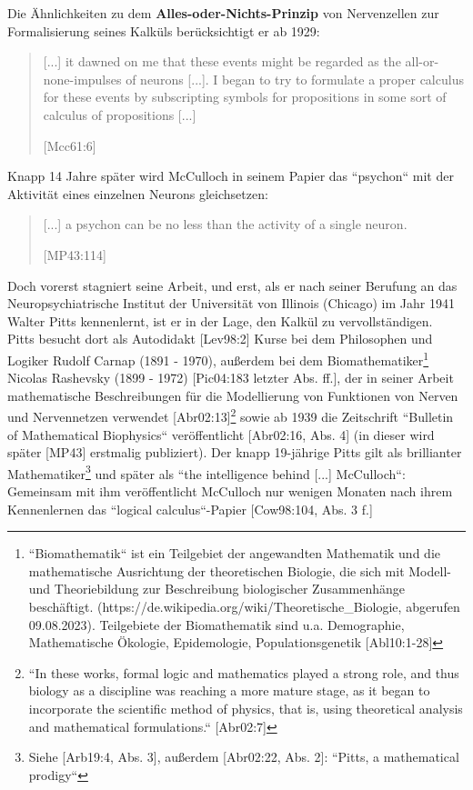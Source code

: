 Die Ähnlichkeiten zu dem \textbf{Alles-oder-Nichts-Prinzip} von Nervenzellen zur Formalisierung seines Kalküls berücksichtigt er ab 1929:

\blockquote[{[Mcc61:6]}]{
    [...] it dawned on me that these events might be regarded as the all-or-none-impulses of neurons [...]. I began to try to formulate a proper calculus for these events by subscripting symbols for propositions in some sort of calculus of propositions [...]
}

Knapp 14 Jahre später wird McCulloch in seinem Papier das ``psychon`` mit der Aktivität eines einzelnen Neurons gleichsetzen:

\blockquote[{[MP43:114]}]{
    [...] a psychon can be no less than the activity of a single neuron.
}

Doch vorerst stagniert seine Arbeit, und erst, als er nach seiner Berufung an das Neuropsychiatrische Institut der Universität von Illinois (Chicago) im Jahr 1941 Walter Pitts kennenlernt, ist er in der Lage, den Kalkül zu vervollständigen.\\

Pitts besucht dort als Autodidakt [Lev98:2] Kurse bei dem Philosophen und Logiker Rudolf Carnap (1891 - 1970), außerdem bei dem Biomathematiker\footnote{
    ``Biomathematik`` ist ein Teilgebiet der angewandten Mathematik und die mathematische Ausrichtung der theoretischen Biologie, die sich mit Modell- und Theoriebildung zur Beschreibung biologischer Zusammenhänge beschäftigt. ({https://de.wikipedia.org/wiki/Theoretische\_Biologie}, abgerufen 09.08.2023). Teilgebiete der Biomathematik sind u.a. Demographie, Mathematische Ökologie, Epidemologie, Populationsgenetik [Abl10:1-28]
} Nicolas Rashevsky (1899 - 1972) [Pic04:183 letzter Abs. ff.], der in seiner Arbeit mathematische Beschreibungen für die Modellierung von Funktionen von Nerven und Nervennetzen verwendet [Abr02:13]\footnote{
    ``In these works, formal logic and mathematics played a strong role, and thus biology as a discipline was reaching a more mature stage, as it began to incorporate the scientific method of physics, that is, using theoretical analysis and mathematical formulations.`` [Abr02:7]
} sowie ab 1939 die Zeitschrift ``Bulletin of Mathematical Biophysics`` veröffentlicht [Abr02:16, Abs. 4] (in dieser wird später [MP43] erstmalig publiziert).
Der knapp 19-jährige Pitts gilt als brillianter Mathematiker\footnote{
    Siehe [Arb19:4, Abs. 3], außerdem [Abr02:22, Abs. 2]: ``Pitts, a mathematical prodigy``
} und später als ``the intelligence behind [...] McCulloch``: Gemeinsam mit ihm veröffentlicht McCulloch nur wenigen Monaten nach ihrem Kennenlernen das ``logical calculus``-Papier [Cow98:104, Abs. 3 f.]


